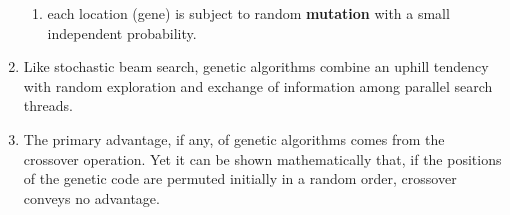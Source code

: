\begin{enumerate}
\begin{enumerate}
        \item each location (gene) is subject to random \textbf{mutation} with a small independent probability. 
        \hfill \cite{ai/book/Artificial-Intelligence-A-Modern-Approach/Russell-Norvig}
    \end{enumerate}

    \item Like stochastic beam search, genetic algorithms combine an uphill tendency with random exploration and exchange of information among parallel search threads.
    \hfill \cite{ai/book/Artificial-Intelligence-A-Modern-Approach/Russell-Norvig}

    \item The primary advantage, if any, of genetic algorithms comes from the crossover operation. 
    Yet it can be shown mathematically that, if the positions of the genetic code are permuted initially in a random order, crossover conveys no advantage. 
    \hfill \cite{ai/book/Artificial-Intelligence-A-Modern-Approach/Russell-Norvig}
\end{enumerate}

















